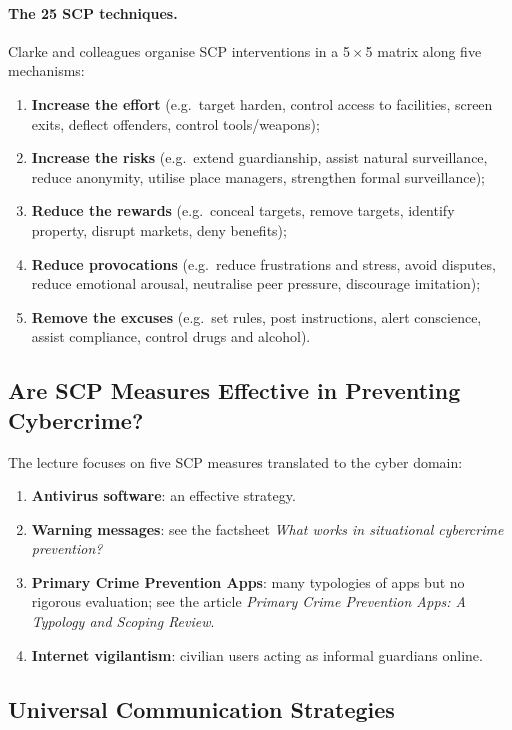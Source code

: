 \documentclass[11pt,a4paper,openany]{report}
\theoremstyle{definition}
\theoremstyle{plain}
\theoremstyle{remark}
\begin{document}
\paragraph{The 25 SCP techniques.} Clarke and colleagues organise SCP interventions in a 5\,$\times$\,5 matrix along five mechanisms:
\begin{enumerate}
    \item \textbf{Increase the effort} (e.g.\ target harden, control access to facilities, screen exits, deflect offenders, control tools/weapons);
    \item \textbf{Increase the risks} (e.g.\ extend guardianship, assist natural surveillance, reduce anonymity, utilise place managers, strengthen formal surveillance);
    \item \textbf{Reduce the rewards} (e.g.\ conceal targets, remove targets, identify property, disrupt markets, deny benefits);
    \item \textbf{Reduce provocations} (e.g.\ reduce frustrations and stress, avoid disputes, reduce emotional arousal, neutralise peer pressure, discourage imitation);
    \item \textbf{Remove the excuses} (e.g.\ set rules, post instructions, alert conscience, assist compliance, control drugs and alcohol).
\end{enumerate}

\subsection{Are SCP Measures Effective in Preventing Cybercrime?}

The lecture focuses on five SCP measures translated to the cyber domain:
\begin{enumerate}
    \item \textbf{Antivirus software}: an effective strategy.
    \item \textbf{Warning messages}: see the factsheet \textit{What works in situational cybercrime prevention?}
    \item \textbf{Primary Crime Prevention Apps}: many typologies of apps but no rigorous evaluation; see the article \textit{Primary Crime Prevention Apps: A Typology and Scoping Review}.
    \item \textbf{Internet vigilantism}: civilian users acting as informal guardians online.
\end{enumerate}

\subsection{Universal Communication Strategies}
\end{document}
